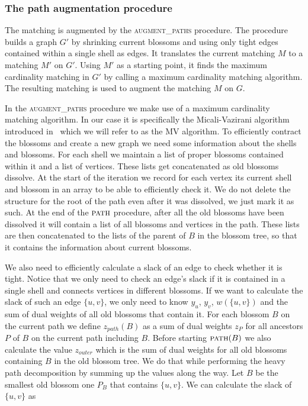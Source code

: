 \subsubsection{The path augmentation procedure}

The matching is augmented by the \textsc{augment\_paths} procedure. The procedure builds a graph $G'$ by shrinking current blossoms and using only tight edges contained within a single shell as edges. It translates the current matching $M$ to a matching $M'$ on $G'$. Using $M'$ as a starting point, it finds the maximum cardinality matching in $G'$ by calling a maximum cardinality matching algorithm. The resulting matching is used to augment the matching $M$ on $G$.

In the \textsc{augment\_paths} procedure we make use of a maximum cardinality matching algorithm. In our case it is specifically the Micali-Vazirani algorithm introduced in~\cite{micali1980v} which we will refer to as the MV algorithm. To efficiently contract the blossoms and create a new graph we need some information about the shells and blossoms. For each shell we maintain a list of proper blossoms contained within it and a list of vertices. These lists get concatenated as old blossoms dissolve. At the start of the iteration we record for each vertex its current shell and blossom in an array to be able to efficiently check it. We do not delete the structure for the root of the path even after it was dissolved, we just mark it as such. At the end of the $\textsc{path}$ procedure, after all the old blossoms have been dissolved it will contain a list of all blossoms and vertices in the path. These lists are then concatenated to the lists of the parent of $B$ in the blossom tree, so that it contains the information about current blossoms.

We also need to efficiently calculate a slack of an edge to check whether it is tight. Notice that we only need to check an edge's slack if it is contained in a single shell and connects vertices in different blossoms. If we want to calculate the slack of such an edge $\{u, v\}$, we only need to know $y_u$, $y_v$, $w(\{u, v\})$ and the sum of dual weights of all old blossoms that contain it. For each blossom $B$ on the current path we define $z_{path}(B)$ as a sum of dual weights $z_P$ for all ancestors $P$ of $B$ on the current path including $B$. Before starting $\textsc{path}(B)$ we also calculate the value $z_{outer}$ which is the sum of dual weights for all old blossoms containing $B$ in the old blossom tree. We do that while performing the heavy path decomposition by summing up the values along the way. Let $B$ be the smallest old blossom one $P_B$ that contains $\{u, v\}$. We can calculate the slack of $\{u, v\}$ as

